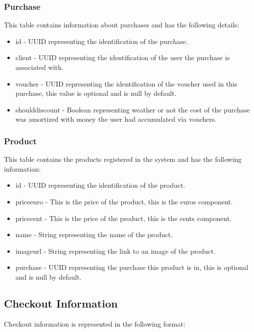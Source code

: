 \documentclass[12pt]{article}
\begin{document}
\subsubsection{Purchase}
\hspace{0.6cm}
This table contains information about purchases and has the following details:
\begin{itemize}
    \item id - UUID representing the identification of the purchase.
	\item client - UUID representing the identification of the user the purchase is associated with.
	\item voucher - UUID representing the identification of the voucher used in this purchase, this value is optional and is null by default.
	\item should\textunderscore discount - Boolean representing weather or not the cost of the purchase was amortized with money the user had accumulated via vouchers.
\end{itemize}


\subsubsection{Product}
\hspace{0.6cm}
This table contains the products registered in the system and has the following information:
\begin{itemize}
    \item id - UUID representing the identification of the product.
	\item price\textunderscore euro - This is the price of the product, this is the euros component.
	\item price\textunderscore cent - This is the price of the product, this is the cents component.
	\item name - String representing the name of the product.
	\item image\textunderscore url - String representing the link to an image of the product.
	\item purchase - UUID representing the purchase this product is in, this is optional and is null by default.
\end{itemize}


\subsection{Checkout Information}
\hspace{0.6cm}
Checkout information is represented in the following format:
\end{document}
